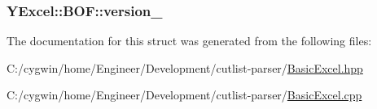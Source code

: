 \subsubsection[{version\+\_\+}]{ Y\+Excel\+::\+B\+O\+F\+::version\+\_\+}\label{struct_y_excel_1_1_b_o_f_aadcc53d1390fa301154dcea75da8b8b3}


The documentation for this struct was generated from the following files\+:\begin{DoxyCompactItemize}
\item 
C\+:/cygwin/home/\+Engineer/\+Development/cutlist-\/parser/\hyperlink{_basic_excel_8hpp}{Basic\+Excel.\+hpp}\item 
C\+:/cygwin/home/\+Engineer/\+Development/cutlist-\/parser/\hyperlink{_basic_excel_8cpp}{Basic\+Excel.\+cpp}\end{DoxyCompactItemize}
